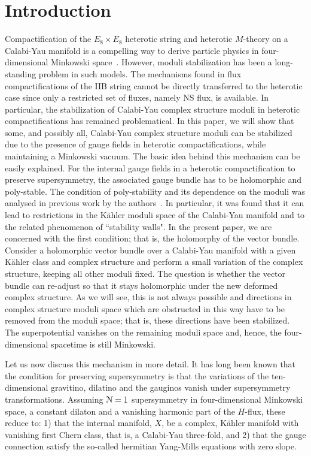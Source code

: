 \documentclass[12pt]{article}
\numberwithin{equation}{section}
\begin{document}
\section{Introduction}
Compactification of the $E_{8} \times E_{8}$ heterotic string \cite{Candelas:1985en,Green:1987mn} and heterotic $M$-theory \cite{Witten:1996mz,Lukas:1997fg,Lukas:1998yy} on a Calabi-Yau manifold is a compelling way to derive particle physics in four-dimensional Minkowski space~\cite{burt,Bouchard:2005ag,Anderson:2009mh}. However, moduli stabilization has been a long-standing problem in such models. The mechanisms found in flux compactifications of the IIB string cannot be directly transferred to the heterotic case since only a restricted set of fluxes, namely NS flux, is available. In particular, the stabilization of Calabi-Yau complex structure moduli in heterotic compactifications has remained problematical. In this paper, we will show that some, and possibly all, Calabi-Yau complex structure moduli can be stabilized due to the presence of gauge fields in heterotic compactifications, while maintaining a Minkowski vacuum. The basic idea behind this mechanism can be easily explained. For the internal gauge fields in a heterotic compactification to preserve supersymmetry, the associated gauge bundle has to be holomorphic and poly-stable. The condition of poly-stability and its dependence on the moduli was analysed in previous work by the authors~\cite{Anderson:2009sw,Anderson:2009nt,Anderson:2010tc}. In particular, it was found that it can lead to restrictions in the K\"ahler moduli space of the Calabi-Yau manifold and to the related  phenomenon of ``stability walls". In the present paper, we are concerned with the first condition; that is, the holomorphy of the vector bundle. Consider a holomorphic vector bundle over a Calabi-Yau manifold with a given K\"ahler class and complex structure and perform a small variation of the complex structure, keeping all other moduli fixed. The question is whether the vector bundle can re-adjust so that it stays holomorphic under the new deformed complex structure. As we will see, this is not always possible and directions in complex structure moduli space which are obstructed in this way have to be removed from the moduli space; that is, these directions have been stabilized. The superpotential vanishes on the remaining moduli space and, hence, the four-dimensional spacetime is still Minkowski. 

Let us now discuss this mechanism in more detail. It has long been known \cite{Green:1987mn} that the condition for preserving supersymmetry is that the variations of the ten-dimensional gravitino, dilatino and the gauginos vanish under supersymmetry transformations. Assuming ${\cal{N}}=1$ supersymmetry in four-dimensional Minkowski space, a constant dilaton and a vanishing harmonic part of the $H$-flux, these reduce to: 1) that the internal manifold,  $X$, be a complex, K\"ahler manifold with vanishing first Chern class, that is, a Calabi-Yau three-fold, and 2) that the gauge connection satisfy the so-called hermitian Yang-Mills equations with zero slope. 
\end{document}

